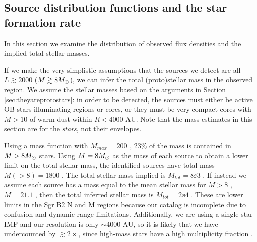 \documentclass[twocolumn]{aastex61}
\begin{document}
\subsection{Source distribution functions and the star formation rate}
\label{sec:distributionsandsfr}

In this section we examine the distribution of observed flux densities and the
implied total stellar masses.  


If we make the very simplistic assumptions that the sources we detect are all
$L\gtrsim2000$ \lsun ($M\gtrsim8 M_{\odot}$), we can infer the total (proto)stellar
mass in the observed region.  We assume the stellar masses based on the arguments
in Section \ref{sec:theyareprotostars}: in order to be detected, the sources
must either be active OB stars illuminating \hii regions or cores, or they must
be very compact cores with $M>10$ \msun of warm dust within $R<4000$ AU.
Note that the mass estimates in this section are for the \emph{stars}, not
their envelopes.

Using a \citet{Kroupa2001a} mass function with $M_{max}=200$ \msun, 23\% of the
mass is contained in $M>8M_{\odot}$ stars.  Using $M=8M_{\odot}$ as the mass of each
source to obtain a lower limit on the total stellar mass, the identified
sources have total mass $M(>8)=1800$ \msun.  The total stellar mass implied is
$M_{tot} = 8\ee{3}$ \msun.  If instead we assume each source has a mass equal
to the mean stellar mass for $M>8$ \msun, $\bar{M}=21.1$ \msun, then the total
inferred stellar mass is $M_{tot}=2\ee{4}$ \msun.  These are lower limits in
the Sgr B2 N and M regions because our catalog is incomplete due to confusion
and dynamic range limitations.  Additionally, we are using a single-star IMF
and our resolution is only $\sim4000$ AU, so it is likely that we have
undercounted by $\gtrsim2\times$, since high-mass stars have a high
multiplicity fraction \citep{Mason2009a}.
\end{document}
